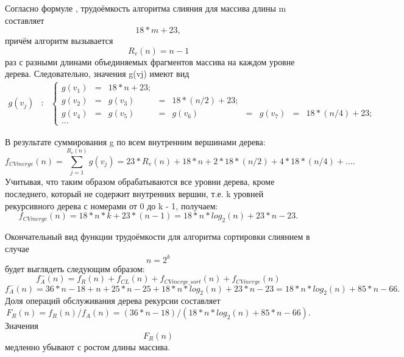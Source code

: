 \documentclass[12pt,a4paper]{scrartcl}
\begin{document}
Согласно формуле \label{eq2.1} , трудоёмкость алгоритма слияния для массива длины m составляет 
\begin{equation*}
18*m + 23,
\end{equation*}
причём алгоритм вызывается
\begin{equation*}
R_v(n) = n - 1
\end{equation*}
раз с разными длинами объединяемых фрагментов массива на каждом уровне дерева. Следовательно, значения g(vj) имеют вид
\begin{equation}\label{eq2.16}
\begin{matrix}
    g(v_j) & :
    & \left\{
    \begin{matrix}
    g(v_1) & = & 18*n + 23; \\
    g(v_2) & = & g(v_3) & = & 18*(n/2) + 23;\\
    g(v_4) & = & g(v_5) & = & g(v_6) & = & g(v_7) & = & 18*(n/4) + 23; \\
    ...
    \end{matrix} \right.
    \end{matrix}
\end{equation}

В результате суммирования g по всем внутренним вершинами дерева:
\begin{equation}\label{eq2.17}
f_{CV merge}(n) = \sum \limits_{j=1}^{R_v(n)} g(v_j) = 23*R_v(n) + 18*n + 2*18*(n/2) + 4*18*(n/4) + ... .
\end{equation}
Учитывая, что таким образом обрабатываются все уровни дерева, кроме последнего, который не содержит внутренних вершин, т.е. k уровней рекурсивного дерева с номерами от 0 до k - 1, получаем:
\begin{equation}\label{eq2.18}
f_{CV merge}(n) = 18*n*k + 23*(n - 1) = 18*n*log_2(n) + 23*n - 23.
\end{equation}

Окончательный вид функции трудоёмкости для алгоритма сортировки слиянием в случае 
\begin{equation*}
n = 2^k
\end{equation*}
будет выглядеть следующим образом:
\begin{equation}\label{eq2.18}
f_A^-(n) = f_R(n) + f_{CL}(n) + f_{CV merge\_sort}(n) + f_{CV merge}(n)
\end{equation}
\begin{equation}\label{eq2.19}
f_A^-(n) = 36*n - 18 + n + 25*n - 25 + 18*n*log_2(n) + 23*n - 23 = 18*n*log_2(n) + 85*n - 66.
\end{equation}
Доля операций обслуживания дерева рекурсии составляет
\begin{equation}\label{eq2.20}
F_R(n) = f_R(n) / f_A(n) = (36*n - 18) / (18*n*log_2(n) + 85*n - 66).
\end{equation}
Значения 
\begin{equation*} 
F_R(n) 
\end{equation*} 
медленно убывают с ростом длины массива.
\end{document}
